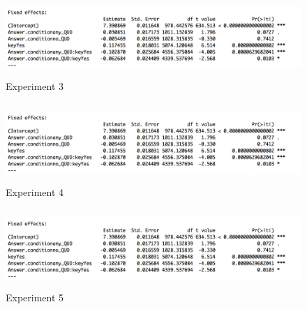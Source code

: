 \documentclass[12pt]{article}
\begin{document}
\begin{figure}[!ht]
    \caption*{Experiment 3}
    \includegraphics[height=3cm]{models/exp4_model2_new}
\end{figure}
\begin{figure}[!ht] 
    \caption*{Experiment 4}
    \includegraphics[height=3cm]{models/exp4_model2_new}
\end{figure}
\begin{figure}[!ht]
    \caption*{Experiment 5}
    \includegraphics[height=3cm]{models/exp4_model2_new}
\end{figure} 



\pagebreak
\end{document}
